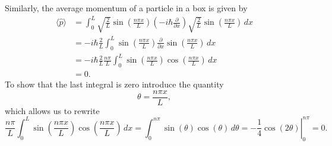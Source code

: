 \documentclass[../Main/chem331-notes.tex]{subfiles}
\begin{document}
Similarly, the average momentum of a particle in a box is given by
\begin{equation}
\begin{split}
\langle \hat{p} \rangle
&= \int_0^L \sqrt{\frac{2}{L}} \sin \left(\frac{n \pi x}{L}\right) \left( -i \hbar \frac{\partial}{\partial x} \right) \sqrt{\frac{2}{L}} \sin \left(\frac{n \pi x}{L}\right) \, dx \\
&= -i \hbar \frac{2}{L}  \int_0^L \sin \left(\frac{n \pi x}{L}\right) \frac{\partial}{\partial x} \sin \left(\frac{n \pi x}{L}\right)\, dx \\
&= -i \hbar \frac{2}{L} \frac{n \pi}{L}  \int_0^L \sin \left(\frac{n \pi x}{L}\right) \cos \left(\frac{n \pi x}{L}\right)\, dx \\
& = 0.
\end{split}
\end{equation}
To show that the last integral is zero introduce the quantity
\begin{equation}
\theta = \frac{n \pi x}{L},
\end{equation}
which allows us to rewrite
\begin{equation}
\frac{n \pi}{L} \int_0^L \sin \left(\frac{n \pi x}{L}\right) \cos \left(\frac{n \pi x}{L}\right)\, dx 
= \int_0^{n \pi} \sin(\theta) \cos(\theta)\, d\theta 
= \left.-\frac{1}{4} \cos(2 \theta) \right|^{n\pi}_{0}  = 0.
\end{equation}
\end{document}
